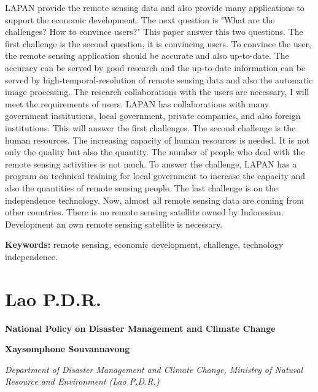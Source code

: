 {{LAPAN provide the remote sensing data and also provide many applications to support the economic development. The next question is "What are the challenges? How to convince users?" This paper answer this two questions. The first challenge is the second question, it is convincing users. To convince the user, the remote sensing application should be accurate and also up-to-date. The accuracy can be served by good research and the up-to-date information can be served by high-temporal-resolution of remote sensing data and also the automatic image processing. The research collaborations with the users are necessary, I will meet the requirements of users. LAPAN has collaborations with many government institutions, local government, private companies, and also foreign institutions. This will answer the first challenges.  The second challenge is the human resources. The increasing capacity of human resources is needed. It is not only the quality but also the quantity. The number of people who deal with the remote sensing activities is not much. To answer the challenge, LAPAN has a program on technical training for local government to increase the capacity and also the quantities of remote sensing people. The last challenge is on the independence technology. Now, almost all remote sensing data are coming from other countries. There is no remote sensing satellite owned by Indonesian. Development an own remote sensing satellite is necessary.
\par}
\begin{center}
\textbf{Keywords:} remote sensing, economic development, challenge, technology independence.  \par
\end{center}
}


\section{Lao P.D.R.}

\vspace{0.5 cm}

	\begin{center}
	{\large \bfseries National Policy on Disaster Management and Climate Change\par}
	\vspace{0.5 cm}
	{\bfseries Xaysomphone Souvannavong\par}
	{\itshape Department of Disaster Management and Climate Change, Ministry of Natural Resource and Environment (Lao P.D.R.)\par}
	\end{center}
	
